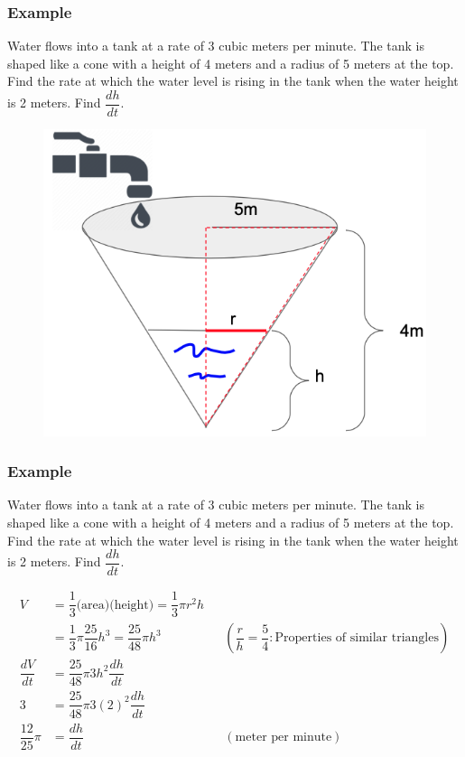 \documentclass[t]{beamer}
\theoremstyle{plain}
\theoremstyle{definition}
\begin{document}
\begin{frame}
\footnotesize
\frametitle{Example}
Water flows into a tank at a rate of 3 cubic meters per minute. The tank is shaped like a cone with a height of 4 meters and a radius of 5 meters at the top.  Find the rate at which the water level is rising in the tank when the water height is 2 meters.   Find $\dfrac{dh}{dt}$.

\begin{figure}[t]
\begin{center}
\includegraphics[scale=0.25]{fig/watertank}
\end{center}
\end{figure}

\end{frame}

\begin{frame}
\footnotesize
\frametitle{Example}
Water flows into a tank at a rate of 3 cubic meters per minute. The tank is shaped like a cone with a height of 4 meters and a radius of 5 meters at the top.  Find the rate at which the water level is rising in the tank when the water height is 2 meters.    Find $\dfrac{dh}{dt}$.

\begin{align*}
	V &= \dfrac{1}{3}\text{(area)}\text{(height)} = \dfrac{1}{3}\pi r^2 h\\
	&= \dfrac{1}{3}\pi \dfrac{25}{16} h^3 = \dfrac{25}{48}\pi h^3 && (\dfrac{r}{h} = \dfrac{5}{4}: \text{Properties of similar triangles}) \\
	\dfrac{dV}{dt} &= \dfrac{25}{48}\pi 3h^2 \dfrac{dh}{dt}\\
	3 &=  \dfrac{25}{48}\pi 3 (2)^2 \dfrac{dh}{dt}\\
	\dfrac{12}{25}\pi &=  \dfrac{dh}{dt} && (\text{meter per minute})\\
\end{align*}

\end{frame}
\end{document}

